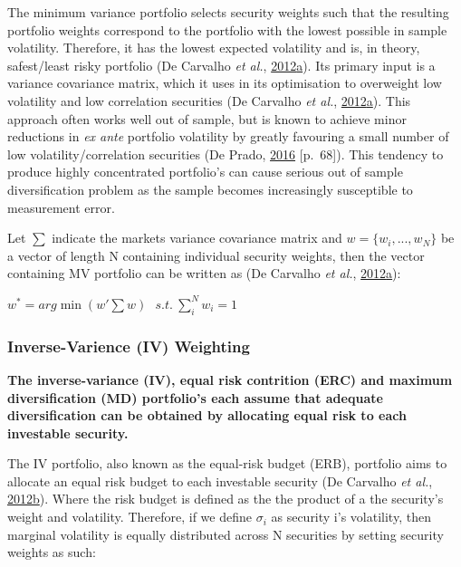 \documentclass[11pt,preprint, authoryear]{elsarticle}
\numberwithin{equation}{section}
\numberwithin{figure}{section}
\numberwithin{table}{section}
\begin{document}
The minimum variance portfolio selects security weights such that the
resulting portfolio weights correspond to the portfolio with the lowest
possible in sample volatility. Therefore, it has the lowest expected
volatility and is, in theory, safest/least risky portfolio (De Carvalho
\emph{et al.},
\protect\hyperlink{ref-rawl2012}{2012}\protect\hyperlink{ref-rawl2012}{a}).
Its primary input is a variance covariance matrix, which it uses in its
optimisation to overweight low volatility and low correlation securities
(De Carvalho \emph{et al.},
\protect\hyperlink{ref-rawl2012}{2012}\protect\hyperlink{ref-rawl2012}{a}).
This approach often works well out of sample, but is known to achieve
minor reductions in \emph{ex ante} portfolio volatility by greatly
favouring a small number of low volatility/correlation securities (De
Prado, \protect\hyperlink{ref-lopez}{2016} {[}p.~68{]}). This tendency
to produce highly concentrated portfolio's can cause serious out of
sample diversification problem as the sample becomes increasingly
susceptible to measurement error.

Let \(\sum\) indicate the markets variance covariance matrix and
\(w=\{w_i,..., w_N \}\) be a vector of length N containing individual
security weights, then the vector containing MV portfolio can be written
as (De Carvalho \emph{et al.},
\protect\hyperlink{ref-rawl2012}{2012}\protect\hyperlink{ref-rawl2012}{a}):

\(w^*=arg\min(w'\sum w)\ \ \ s.t.\ \sum^N_iw_i=1\)

\hypertarget{inverse-varience-iv-weighting}{%
\subsubsection{Inverse-Varience (IV)
Weighting}\label{inverse-varience-iv-weighting}}

\textbf{The inverse-variance (IV), equal risk contrition (ERC) and
maximum diversification (MD) portfolio's each assume that adequate
diversification can be obtained by allocating equal risk to each
investable security.}

The IV portfolio, also known as the equal-risk budget (ERB), portfolio
aims to allocate an equal risk budget to each investable security (De
Carvalho \emph{et al.},
\protect\hyperlink{ref-leote}{2012}\protect\hyperlink{ref-leote}{b}).
Where the risk budget is defined as the the product of a the security's
weight and volatility. Therefore, if we define \(\sigma_i\) as security
i's volatility, then marginal volatility is equally distributed across N
securities by setting security weights as such:
\end{document}
